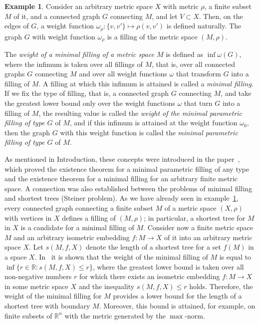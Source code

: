 \documentclass[10pt]{article}
\theoremstyle{plain}
\theoremstyle{definition}
\newtheorem{examp}[thm]{Example}
\def\:{\colon}
\def\om{\omega}
\newcommand{\R}{{\mathbb R}}
\begin{document}
\begin{examp}\label{example:net_fill}
Consider an arbitrary metric space $X$ with metric $\rho$, a finite subset $M$ of it, and a connected graph $G$ connecting $M$, and let $V\subset X$. Then, on the edges of $G$, a weight function $\om_\rho\:\{v,v'\}\mapsto\rho(v,v')$ is defined naturally. The graph $G$ with weight function $\om_\rho$ is a filling of the metric space $(M,\rho)$.
\end{examp}

The \emph{weight of a minimal filling of a metric space $M$} is defined as $\inf \om(G)$, where the infimum is taken over all fillings of $M$, that is, over all connected graphs $G$ connecting $M$ and over all weight functions $\om$ that transform $G$ into a filling of $M$. A filling at which this infimum is attained is called a \emph{minimal filling}. If we fix the type of filling, that is, a connected graph $G$ connecting $M$, and take the greatest lower bound only over the weight functions $\om$ that turn $G$ into a filling of $M$, the resulting value is called the \emph{weight of the minimal parametric filling of type $G$} of $M$, and if this infimum is attained at the weight function $\om_0$, then the graph $G$ with this weight function is called the \emph{minimal parametric filling of type $G$} of $M$.

As mentioned in Introduction, these concepts were introduced in the paper~\cite{IT_MSb}, which proved the existence theorem for a minimal parametric filling of any type and the existence theorem for a minimal filling for an arbitrary finite metric space. A connection was also established between the problems of minimal filling and shortest trees (Steiner problem). As we have already seen in example~\ref{example:net_fill}, every connected graph connecting a finite subset $M$ of a metric space $(X,\rho)$ with vertices in $X$ defines a filling of $(M,\rho)$; in particular, a shortest tree for $M$ in $X$ is a candidate for a minimal filling of $M$. Consider now a finite metric space $M$ and an arbitrary isometric embedding $f\:M\to X$ of it into an arbitrary metric space $X$. Let $s(M,f,X)$ denote the length of a shortest tree for a set $f(M)$ in a space $X$. In~\cite{IT_MSb} it is shown that the weight of the minimal filling of $M$ is equal to $\inf\big\{r\in\R: s(M,f,X)\le r\big\}$, where the greatest lower bound is taken over all non-negative numbers $r$ for which there exists an isometric embedding $f\:M\to X$ in some metric space $X$ and the inequality $s(M,f,X)\le r$ holds. Therefore, the weight of the minimal filling for $M$ provides a lower bound for the length of a shortest tree with boundary $M$. Moreover, this bound is attained, for example, on finite subsets of $\R^n$ with the metric generated by the $\max$-norm.
\end{document}
